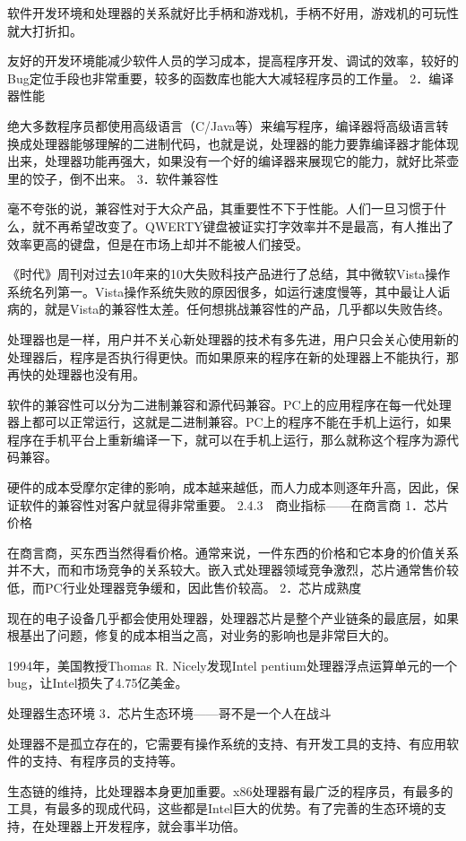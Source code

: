 \documentclass[12pt,UTF8]{ctexbook}
\begin{document}
软件开发环境和处理器的关系就好比手柄和游戏机，手柄不好用，游戏机的可玩性就大打折扣。

友好的开发环境能减少软件人员的学习成本，提高程序开发、调试的效率，较好的Bug定位手段也非常重要，较多的函数库也能大大减轻程序员的工作量。
2．编译器性能

绝大多数程序员都使用高级语言（C/Java等）来编写程序，编译器将高级语言转换成处理器能够理解的二进制代码，也就是说，处理器的能力要靠编译器才能体现出来，处理器功能再强大，如果没有一个好的编译器来展现它的能力，就好比茶壶里的饺子，倒不出来。
3．软件兼容性

毫不夸张的说，兼容性对于大众产品，其重要性不下于性能。人们一旦习惯于什么，就不再希望改变了。QWERTY键盘被证实打字效率并不是最高，有人推出了效率更高的键盘，但是在市场上却并不能被人们接受。

《时代》周刊对过去10年来的10大失败科技产品进行了总结，其中微软Vista操作系统名列第一。Vista操作系统失败的原因很多，如运行速度慢等，其中最让人诟病的，就是Vista的兼容性太差。任何想挑战兼容性的产品，几乎都以失败告终。

处理器也是一样，用户并不关心新处理器的技术有多先进，用户只会关心使用新的处理器后，程序是否执行得更快。而如果原来的程序在新的处理器上不能执行，那再快的处理器也没有用。

软件的兼容性可以分为二进制兼容和源代码兼容。PC上的应用程序在每一代处理器上都可以正常运行，这就是二进制兼容。PC上的程序不能在手机上运行，如果程序在手机平台上重新编译一下，就可以在手机上运行，那么就称这个程序为源代码兼容。

硬件的成本受摩尔定律的影响，成本越来越低，而人力成本则逐年升高，因此，保证软件的兼容性对客户就显得非常重要。
2.4.3　商业指标——在商言商
1．芯片价格

在商言商，买东西当然得看价格。通常来说，一件东西的价格和它本身的价值关系并不大，而和市场竞争的关系较大。嵌入式处理器领域竞争激烈，芯片通常售价较低，而PC行业处理器竞争缓和，因此售价较高。
2．芯片成熟度

现在的电子设备几乎都会使用处理器，处理器芯片是整个产业链条的最底层，如果根基出了问题，修复的成本相当之高，对业务的影响也是非常巨大的。

1994年，美国教授Thomas R. Nicely发现Intel pentium处理器浮点运算单元的一个bug，让Intel损失了4.75亿美金。

处理器生态环境
3．芯片生态环境——哥不是一个人在战斗

处理器不是孤立存在的，它需要有操作系统的支持、有开发工具的支持、有应用软件的支持、有程序员的支持等。

生态链的维持，比处理器本身更加重要。x86处理器有最广泛的程序员，有最多的工具，有最多的现成代码，这些都是Intel巨大的优势。有了完善的生态环境的支持，在处理器上开发程序，就会事半功倍。
\end{document}
